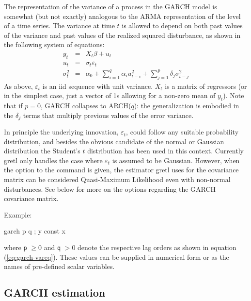 The representation of the variance of a process in the GARCH model is
somewhat (but not exactly) analogous to the ARMA representation of the
level of a time series.  The variance at time $t$ is allowed
to depend on both past values of the variance and past values of the
realized squared disturbance, as shown in the following system
of equations:
\begin{eqnarray}
  \label{eq:garch-meaneq}
  y_t &  = & X_t \beta + u_t \\
  \label{eq:garch-epseq}
  u_t &  = & \sigma_t \varepsilon_t \\
  \label{eq:garch-vareq}
  \sigma^2_t & = & \alpha_0 + \sum_{i=1}^q \alpha_i u^2_{t-i} +
	  \sum_{j=1}^p \delta_j \sigma^2_{t-j}
\end{eqnarray}
As above, $\varepsilon_t$ is an iid sequence with unit variance.
$X_t$ is a matrix of regressors (or in the simplest case,
just a vector of 1s allowing for a non-zero mean of $y_t$).  Note that
if $p=0$, GARCH collapses to ARCH($q$): the generalization is embodied
in the $\delta_j$ terms that multiply previous values of the error
variance.

In principle the underlying innovation, $\varepsilon_t$, could follow
any suitable probability distribution, and besides the obvious
candidate of the normal or Gaussian distribution the Student's $t$
distribution has been used in this context.  Currently gretl
only handles the case where $\varepsilon_t$ is assumed to be Gaussian.
However, when the  option to the  command is
given, the estimator gretl uses for the covariance matrix can be
considered Quasi-Maximum Likelihood even with non-normal disturbances.
See below for more on the options regarding the GARCH covariance
matrix.

Example:
\begin{code}
garch p q ; y const x
\end{code}
where \verb|p| $\ge 0$ and \verb|q| $>0$ denote the respective lag
orders as shown in equation (\ref{eq:garch-vareq}).  These values
can be supplied in numerical form or as the names of pre-defined
scalar variables.

\subsection{GARCH estimation}
\label{subsec:garch-est}

